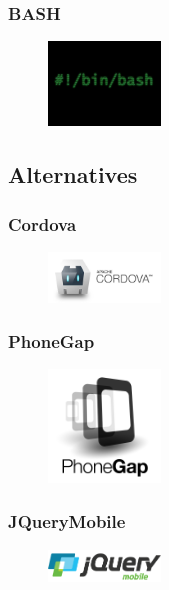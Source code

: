 \subsubsection{BASH}
\begin{figure}
\includegraphics[width=3cm]{img/mobile-app/logos/bash.jpg}
\end{figure} 

\subsection{Alternatives}
\subsubsection{Cordova}
\begin{figure}
\includegraphics[width=3cm]{img/mobile-app/logos/cordova.jpg}
\end{figure} 

\subsubsection{PhoneGap}
\begin{figure}
\includegraphics[width=3cm]{img/mobile-app/logos/PhoneGap.png}
\end{figure} 

\subsubsection{JQueryMobile}
\begin{figure}
\includegraphics[width=3cm]{img/mobile-app/logos/jquery-mobile.png}
\end{figure} 

